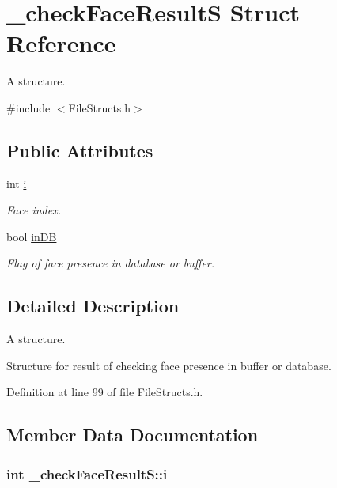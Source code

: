 \hypertarget{struct__check_face_result_s}{}\section{\+\_\+check\+Face\+ResultS Struct Reference}
\label{struct__check_face_result_s}


A structure.  




{\ttfamily \#include $<$File\+Structs.\+h$>$}

\subsection*{Public Attributes}
\begin{DoxyCompactItemize}
\item 
int \hyperlink{struct__check_face_result_s_a016b1da6b53d2a9fe2baf9a88b0699aa}{i}
\begin{DoxyCompactList}\small\item\em Face index. \end{DoxyCompactList}\item 
bool \hyperlink{struct__check_face_result_s_aa7353d6109af6ce0a9b2c8c07e09a48b}{in\+DB}
\begin{DoxyCompactList}\small\item\em Flag of face presence in database or buffer. \end{DoxyCompactList}\end{DoxyCompactItemize}


\subsection{Detailed Description}
A structure. 

Structure for result of checking face presence in buffer or database. 

Definition at line 99 of file File\+Structs.\+h.



\subsection{Member Data Documentation}
\subsubsection[{\texorpdfstring{i}{i}}]{\setlength{\rightskip}{0pt plus 5cm}int \+\_\+check\+Face\+Result\+S\+::i}\hypertarget{struct__check_face_result_s_a016b1da6b53d2a9fe2baf9a88b0699aa}{}\label{struct__check_face_result_s_a016b1da6b53d2a9fe2baf9a88b0699aa}


